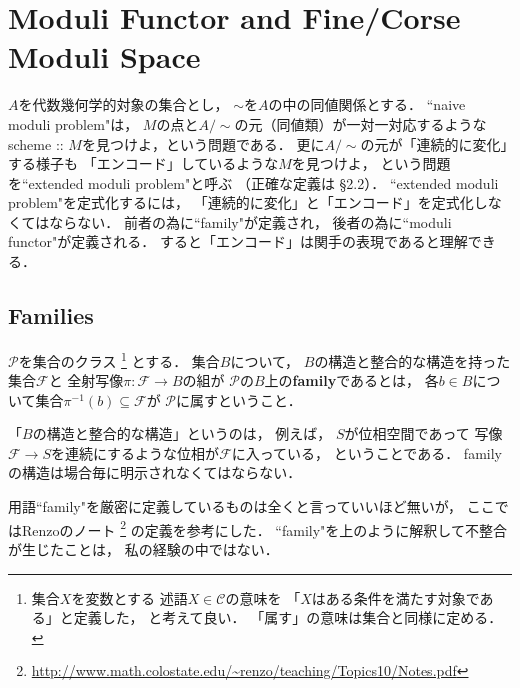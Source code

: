\documentclass[a4paper]{jsarticle}
\newcommand{\famF}{\mathcal{F}}
\begin{document}
\section{Moduli Functor and Fine/Corse Moduli Space}
    $A$を代数幾何学的対象の集合とし，
    $\sim$を$A$の中の同値関係とする．
    ``naive moduli problem"は，
    $M$の点と$A/\sim$の元（同値類）が一対一対応するような
    scheme :: $M$を見つけよ，という問題である．
    更に$A/\sim$の元が「連続的に変化」する様子も
    「エンコード」しているような$M$を見つけよ，
    という問題を``extended moduli problem"と呼ぶ
    （正確な定義は\cite{Hos} \S 2.2）．
    ``extended moduli problem"を定式化するには，
    「連続的に変化」と「エンコード」を定式化しなくてはならない．
    前者の為に``family"が定義され，
    後者の為に``moduli functor"が定義される．
    すると「エンコード」は関手の表現であると理解できる．

    \subsection{Families}
    \begin{Def}
        $\mathcal{P}$を集合のクラス
        \footnote
        {
            集合$X$を変数とする
            述語$X \in \mathcal{C}$の意味を
            「$X$はある条件を満たす対象である」と定義した，
            と考えて良い．
            「属す」の意味は集合と同様に定める．
        }
        とする．
        集合$B$について，
        $B$の構造と整合的な構造を持った集合$\famF$と
        全射写像$\pi: \famF \to B$の組が
        $\mathcal{P}$の$B$上の\textbf{family}であるとは，
        各$b \in B$について集合$\pi^{-1}(b) \subseteq \famF$が
        $\mathcal{P}$に属すということ．
    \end{Def}
    「$B$の構造と整合的な構造」というのは，
    例えば，
    $S$が位相空間であって
    写像$\famF \to S$を連続にするような位相が$\famF$に入っている，
    ということである．
    familyの構造は場合毎に明示されなくてはならない．

    用語``family"を厳密に定義しているものは全くと言っていいほど無いが，
    ここではRenzoのノート
    \footnote{ \url{http://www.math.colostate.edu/~renzo/teaching/Topics10/Notes.pdf} }
    の定義を参考にした．
    ``family"を上のように解釈して不整合が生じたことは，
    私の経験の中ではない．
\end{document}
